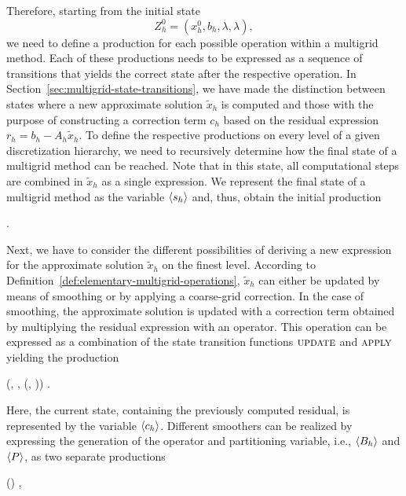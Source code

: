Therefore, starting from the initial state 
\begin{equation}
	Z^0_h = (x_h^0, b_h, \lambda, \lambda),
 \label{eq:initial-mg-state}
\end{equation}
we need to define a production for each possible operation within a multigrid method.
Each of these productions needs to be expressed as a sequence of transitions that yields the correct state after the respective operation.
In Section~\ref{sec:multigrid-state-transitions}, we have made the distinction between states where a new approximate solution $\tilde{x}_h$ is computed and those with the purpose of constructing a correction term $c_h$ based on the residual expression $r_h = b_h - A_h \tilde{x}_h$.
To define the respective productions on every level of a given discretization hierarchy, we need to recursively determine how the final state of a multigrid method can be reached.
Note that in this state, all computational steps are combined in $\tilde{x}_h$ as a single expression.
\renewcommand{\theequation}{p\arabic{production}}
We represent the final state of a multigrid method as the variable $\langle s_h \rangle$ and, thus, obtain the initial production
\begin{bnf}
	 {
	}.
\end{bnf}
Next, we have to consider the different possibilities of deriving a new expression for the approximate solution $\tilde{x}_{h}$ on the finest level.
According to Definition~\ref{def:elementary-multigrid-operations}, $\tilde{x}_{h}$ can either be updated by means of smoothing or by applying a coarse-grid correction.
In the case of smoothing, the approximate solution is updated with a correction term obtained by multiplying the residual expression with an operator.
This operation can be expressed as a combination of the state transition functions $\textsc{update}$ and $\textsc{apply}$ yielding the production
\begin{bnf}
	 {
		(\bnfts{$\omega$}, \bnfsp {}, \bnfsp {}(, \bnfsp {}))
	}.
\label{prod:smoothing}
\end{bnf}
Here, the current state, containing the previously computed residual, is represented by the variable $\langle c_h \rangle$.
Different smoothers can be realized by expressing the generation of the operator and partitioning variable, i.e., $\langle B_h \rangle$ and $\langle P \rangle$, as two separate productions
\begin{bnf}
	 {
		() \bnfsp {} \bnfsp {}
	},
\label{prod:smoothing-operator}
\end{bnf}
